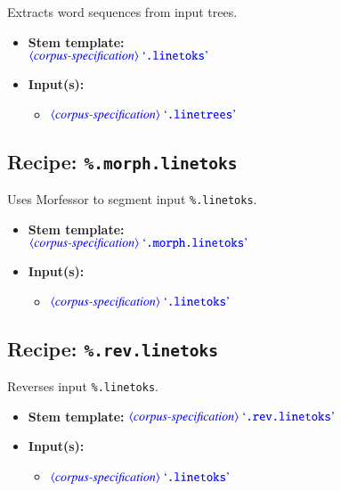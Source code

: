 \documentclass[12pt]{report}
\def\blue{\color{blue}}
\begin{document}
Extracts word sequences from input trees.

\begin{itemize}
      \item \textbf{Stem template:}\\
      $\dtype{corpus-specification} \ \dcode{.linetoks}$
      \item \textbf{Input(s):}
      \begin{itemize}
            \item $\dtype{corpus-specification} \ \dcode{.linetrees}$
      \end{itemize}
\end{itemize}

\subsection{Recipe: {\blue\tt \%.morph.linetoks}}

Uses Morfessor to segment input {\blue\tt \%.linetoks}.

\begin{itemize}
      \item \textbf{Stem template:}\\
      $\dtype{corpus-specification} \ \dcode{.morph.linetoks}$
      \item \textbf{Input(s):}
      \begin{itemize}
            \item $\dtype{corpus-specification} \ \dcode{.linetoks}$
      \end{itemize}
\end{itemize}

\subsection{Recipe: {\blue\tt \%.rev.linetoks}}

Reverses input {\blue\tt \%.linetoks}.

\begin{itemize}
      \item \textbf{Stem template:} $\dtype{corpus-specification} \ \dcode{.rev.linetoks}$
      \item \textbf{Input(s):}
      \begin{itemize}
            \item $\dtype{corpus-specification} \ \dcode{.linetoks}$
      \end{itemize}
\end{itemize}
\end{document}
